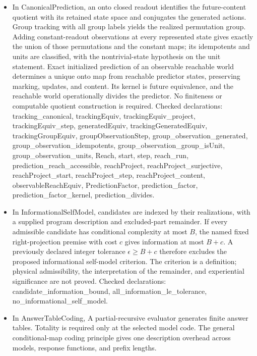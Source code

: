 \documentclass[11pt,a4paper]{article}
\newcommand{\lean}[1]{{\ttfamily\small
  \let\leanunderscore\_\def\_{\leanunderscore\allowbreak}#1}}
\begin{document}
\begin{itemize}[leftmargin=1.4em,itemsep=1pt]
\item {\raggedright In \lean{CanonicalPrediction}, an onto closed readout identifies the future-content quotient with its retained state space and conjugates the generated actions. Group tracking with all group labels yields the realized permutation group. Adding constant-readout observations at every represented state gives exactly the union of those permutations and the constant maps; its idempotents and units are classified, with the nontrivial-state hypothesis on the unit statement. Exact initialized prediction of an observable reachable world determines a unique onto map from reachable predictor states, preserving marking, updates, and content. Its kernel is future equivalence, and the reachable world operationally divides the predictor. No finiteness or computable quotient construction is required.
Checked declarations: \lean{tracking\_canonical}, \lean{trackingEquiv}, \lean{trackingEquiv\_project}, \lean{trackingEquiv\_step}, \lean{generatedEquiv}, \lean{trackingGeneratedEquiv}, \lean{trackingGroupEquiv}, \lean{groupObservationStep}, \lean{group\_observation\_generated}, \lean{group\_observation\_idempotents}, \lean{group\_observation\_group\_isUnit}, \lean{group\_observation\_units}, \lean{Reach}, \lean{start}, \lean{step}, \lean{reach\_run}, \lean{prediction\_reach\_accessible}, \lean{reachProject}, \lean{reachProject\_surjective}, \lean{reachProject\_start}, \lean{reachProject\_step}, \lean{reachProject\_content}, \lean{observableReachEquiv}, \lean{PredictionFactor}, \lean{prediction\_factor}, \lean{prediction\_factor\_kernel}, \lean{prediction\_divides}.\par}
\item {\raggedright In \lean{InformationalSelfModel}, candidates are indexed by their realizations, with a supplied program description and excluded-part remainder. If every admissible candidate has conditional complexity at most $B$, the named fixed right-projection premise with cost $c$ gives information at most $B+c$. A previously declared integer tolerance $\epsilon\ge B+c$ therefore excludes the proposed informational self-model criterion. The criterion is a definition; physical admissibility, the interpretation of the remainder, and experiential significance are not proved.
Checked declarations: \lean{candidate\_information\_bound}, \lean{all\_information\_le\_tolerance}, \lean{no\_informational\_self\_model}.\par}
\item {\raggedright In \lean{AnswerTableCoding}, A partial-recursive evaluator generates finite answer tables. Totality is required only at the selected model code. The general conditional-map coding principle gives one description overhead across models, response functions, and prefix lengths.
}
\end{itemize}
\end{document}
